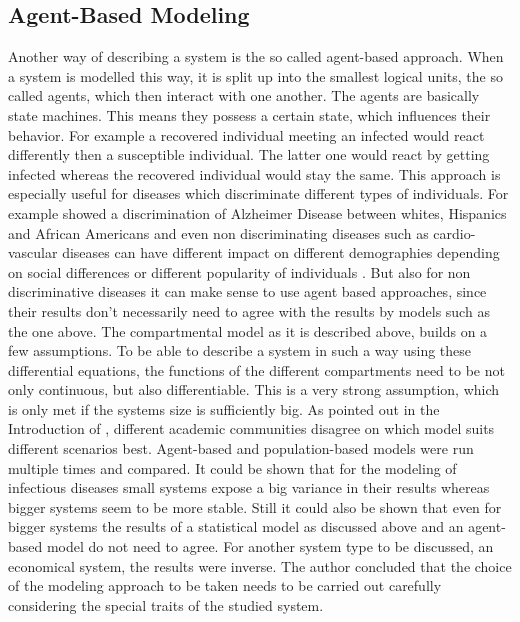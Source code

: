 \subsection{Agent-Based Modeling}\label{chap:agentBasedModelBasics}
Another way of describing a system is the so called agent-based approach. When a system is modelled this way, it is split up into the smallest logical units, the so called agents, which then interact with one another. The agents are basically state machines. This means they possess a certain state, which influences their behavior. For example a recovered individual meeting an infected would react differently then a susceptible individual. The latter one would react by getting infected whereas the recovered individual would stay the same. This approach is especially useful for diseases which discriminate different types of individuals. For example \citep{tang98} showed a discrimination of Alzheimer Disease between whites, Hispanics and African Americans and even non discriminating diseases such as cardio-vascular diseases can have different impact on different demographies depending on social differences \citep{DinDzietham2004449} or different popularity of individuals \citep{saravanan2013mobile}. 
But also for non discriminative diseases it can make sense to use agent based approaches, since their results don't necessarily need to agree with the results by models such as the one above.
The compartmental model as it is described above, builds on a few assumptions. To be able to describe a system in such a way using these differential equations, the functions of the different compartments need to be not only continuous, but also differentiable. This is a very strong assumption, which is only met if the systems size is sufficiently big. As pointed out in the Introduction of \citep{bosse2012comparative}, different academic communities disagree on which model suits different scenarios best. Agent-based and population-based models were run multiple times and compared. It could be shown that for the modeling of infectious diseases small systems expose a big variance in their results whereas bigger systems seem to be more stable. Still it could also be shown that even for bigger systems the results of a statistical model as discussed above and an agent-based model do not need to agree. For another system type to be discussed, an economical system, the results were inverse. The author concluded that the choice of the modeling approach to be taken needs to be carried out carefully considering the special traits of the studied system.